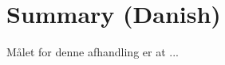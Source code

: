 
\chapter{Summary (Danish)}
\begin{otherlanguage}{danish}

Målet for denne afhandling er at ...




\end{otherlanguage}